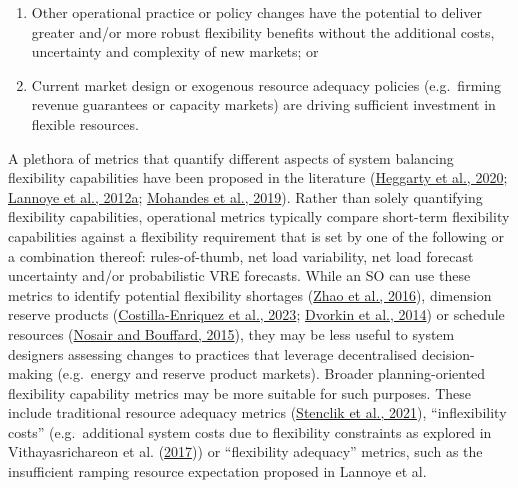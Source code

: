 \documentclass[12pt,a4paper,]{report}
\providecommand{\tightlist}{%
  \setlength{\itemsep}{0pt}\setlength{\parskip}{0pt}}
\begin{document}
\begin{enumerate}
\def\labelenumi{\arabic{enumi}.}
\tightlist
\item
  Other operational practice or policy changes have the potential to
  deliver greater and/or more robust flexibility benefits without the
  additional costs, uncertainty and complexity of new markets; or
\item
  Current market design or exogenous resource adequacy policies
  (e.g.~firming revenue guarantees or capacity markets) are driving
  sufficient investment in flexible resources.
\end{enumerate}

A plethora of metrics that quantify different aspects of system
balancing flexibility capabilities have been proposed in the literature
(\protect\hyperlink{ref-heggartyQuantifyingPowerSystem2020}{Heggarty et
al., 2020};
\protect\hyperlink{ref-lannoyePowerSystemFlexibility2012}{Lannoye et
al., 2012a};
\protect\hyperlink{ref-mohandesReviewPowerSystem2019}{Mohandes et al.,
2019}). Rather than solely quantifying flexibility capabilities,
operational metrics typically compare short-term flexibility
capabilities against a flexibility requirement that is set by one of the
following or a combination thereof: rules-of-thumb, net load
variability, net load forecast uncertainty and/or probabilistic VRE
forecasts. While an SO can use these metrics to identify potential
flexibility shortages
(\protect\hyperlink{ref-zhaoUnifiedFrameworkDefining2016}{Zhao et al.,
2016}), dimension reserve products
(\protect\hyperlink{ref-costilla-enriquezOperatingDynamicReserve2023}{Costilla-Enriquez
et al., 2023};
\protect\hyperlink{ref-dvorkinAssessingFlexibilityRequirements2014}{Dvorkin
et al., 2014}) or schedule resources
(\protect\hyperlink{ref-nosairFlexibilityEnvelopesPower2015}{Nosair and
Bouffard, 2015}), they may be less useful to system designers assessing
changes to practices that leverage decentralised decision-making
(e.g.~energy and reserve product markets). Broader planning-oriented
flexibility capability metrics may be more suitable for such purposes.
These include traditional resource adequacy metrics
(\protect\hyperlink{ref-stenclikQuantifyingRiskUncertain2021}{Stenclik
et al., 2021}), ``inflexibility costs'' (e.g.~additional system costs
due to flexibility constraints as explored in Vithayasrichareon et al.
(\protect\hyperlink{ref-vithayasrichareonOperationalFlexibilityFuture2017}{2017}))
or ``flexibility adequacy'' metrics, such as the insufficient ramping
resource expectation proposed in Lannoye et al.
\end{document}
